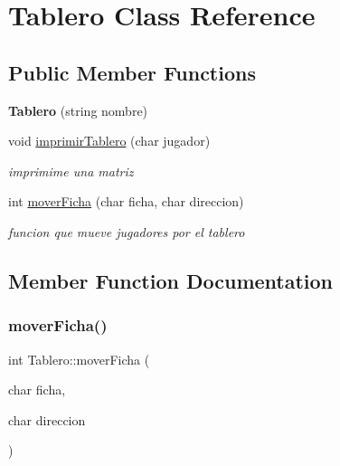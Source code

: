 \hypertarget{class_tablero}{}\section{Tablero Class Reference}
\label{class_tablero}
\subsection*{Public Member Functions}
\begin{DoxyCompactItemize}
\item 
\mbox{\label{class_tablero_a629122126dfbb099d7f0d67ba82ebaf4}} 
{\bfseries Tablero} (string nombre)
\item 
\mbox{\label{class_tablero_a79b0101958d029098ee58d8abcf84871}} 
void \hyperlink{class_tablero_a79b0101958d029098ee58d8abcf84871}{imprimir\+Tablero} (char jugador)
\begin{DoxyCompactList}\small\item\em imprimime una matriz \end{DoxyCompactList}\item 
int \hyperlink{class_tablero_ad14d7ca202c9eebc08ab8104449f5824}{mover\+Ficha} (char ficha, char direccion)
\begin{DoxyCompactList}\small\item\em funcion que mueve jugadores por el tablero \end{DoxyCompactList}\end{DoxyCompactItemize}


\subsection{Member Function Documentation}
\mbox{\label{class_tablero_ad14d7ca202c9eebc08ab8104449f5824}} 
\subsubsection{\texorpdfstring{mover\+Ficha()}{moverFicha()}}
{\footnotesize\ttfamily int Tablero\+::mover\+Ficha (\begin{DoxyParamCaption}\item[{char}]{ficha,  }\item[{char}]{direccion }\end{DoxyParamCaption})\hspace{0.3cm}{\ttfamily [inline]}}



